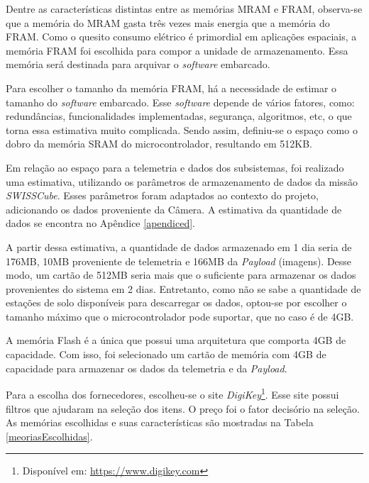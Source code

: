 Dentre as características distintas entre as memórias MRAM e FRAM, observa-se que a memória do MRAM gasta três vezes mais energia que a memória do FRAM. Como o quesito consumo elétrico é primordial em aplicações espaciais, a memória FRAM foi escolhida para compor a unidade de armazenamento. Essa memória será destinada para arquivar o \textit{software} embarcado.

Para escolher o tamanho da memória FRAM, há a necessidade de estimar o tamanho do \textit{software} embarcado. Esse \textit{software} depende de vários fatores, como: redundâncias, funcionalidades implementadas, segurança, algoritmos, etc, o que torna essa estimativa muito complicada. Sendo assim, definiu-se o espaço como o dobro da memória SRAM do microcontrolador,  resultando em 512KB.

Em relação ao espaço para a telemetria e dados dos subsistemas, foi realizado uma estimativa, utilizando os parâmetros de armazenamento de dados da missão \textit{SWISSCube}. Esses parâmetros foram adaptados ao contexto do projeto, adicionando os dados proveniente da Câmera. A estimativa da quantidade de dados se encontra no Apêndice \ref{apendiced}.

A partir dessa estimativa, a quantidade de dados armazenado em 1 dia seria de 176MB, 10MB proveniente de telemetria e 166MB da \textit{Payload} (imagens). Desse modo, um cartão de 512MB seria mais que o suficiente para armazenar os dados provenientes do sistema em 2 dias. Entretanto, como não se sabe a quantidade de estações de solo disponíveis para descarregar os dados, optou-se por escolher o tamanho máximo que o microcontrolador pode suportar, que no caso é de 4GB.

A memória Flash é a única que possui uma arquitetura que comporta 4GB de capacidade. Com isso, foi selecionado um cartão de memória com 4GB de capacidade para armazenar os dados da telemetria e da \textit{Payload}. 

Para a escolha dos fornecedores, escolheu-se o site \textit{DigiKey}\footnote{Disponível em: \url{https://www.digikey.com}}. Esse site possui filtros que ajudaram na seleção dos itens. O preço foi o fator decisório na seleção. As memórias escolhidas e suas características são mostradas na Tabela \ref{meoriasEscolhidas}.

